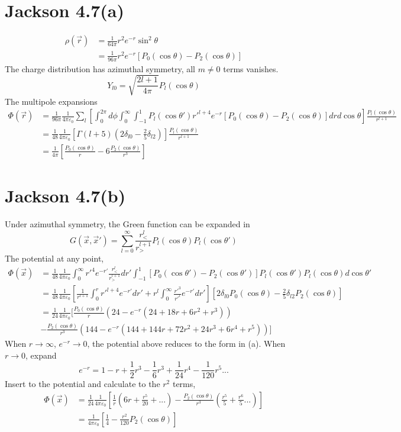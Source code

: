 \documentclass{article}
\begin{document}
\section*{Jackson 4.7(a)}

\begin{align*}
  \rho(\vec r)&=\frac{1}{64\pi}r^2e^{-r}\sin^2\theta\\
              &=\frac{1}{96\pi}r^2e^{-r}[P_0(\cos\theta)-P_2(\cos\theta)]
\end{align*}
The charge distribution has azimuthal symmetry, all $m\neq0$ terms vanishes.
\[ Y_{l0}=\sqrt{\frac{2l+1}{4\pi}}P_l(\cos\theta) \]
The multipole expansions
\begin{align*}
  \Phi(\vec r)&=\frac{1}{96\pi}\frac{1}{4\pi\varepsilon_0}\sum_{l}[\int_0^{2\pi}d\phi \int_0^\infty\int_{-1}^{1}P_l(\cos\theta')r'^{l+4}e^{-r}[P_0(\cos\theta)-P_2(\cos\theta)]drd\cos\theta]\frac{P_l(\cos\theta)}{r^{l+1}}\\
              &=\frac{1}{48}\frac{1}{4\pi\varepsilon_0}[\Gamma(l+5)(2\delta_{l0}-\frac 25 \delta_{l2})]\frac{P_l(\cos\theta)}{r^{l+1}}\\
              &=\frac{1}{4\pi}[\frac{P_0(\cos\theta)}{r}-6\frac{P_2(\cos\theta)}{r^3}]
\end{align*}

\section*{Jackson 4.7(b)}
Under azimuthal symmetry, the Green function can be expanded in
\[ G(\vec x, \vec x')=\sum_{l=0}^\infty\frac{r_<^l}{r_>^{l+1}}P_l(\cos\theta)P_l(\cos\theta') \]
The potential at any point,
\begin{align*}
  \Phi(\vec x)&=\frac{1}{48}\frac{1}{4\pi\varepsilon_0}\int_0^\infty r'^4e^{-r'}\frac{r_<^l}{r_>^{l+1}}dr'\int_{-1}^{1}[P_0(\cos\theta')-P_2(\cos\theta')]P_l(\cos\theta')P_l(\cos\theta)d\cos\theta'\\
              &=\frac{1}{48}\frac{1}{4\pi\varepsilon_0}[\frac{1}{r^{l+1}}\int_0^r r'^{l+4}e^{-r'}dr'+r^l\int_0^\infty \frac{r'^3}{r'^l}e^{-r'}dr'][2\delta_{l0}P_0(\cos\theta)-\frac{2}{5}\delta_{l2}P_2(\cos\theta)]\\
              &=\frac{1}{24}\frac{1}{4\pi\varepsilon_0}[\frac{P_0(\cos\theta)}{r}(24-e^{-r}(24+18r+6r^2+r^3))\\
              &-\frac{P_2(\cos\theta)}{r^3}(144-e^{-r}(144+144r+72r^2+24r^3+6r^4+r^5))]
\end{align*}
When $r\rightarrow\infty$, $e^{-r}\rightarrow 0$, the potential above reduces to the form in (a). When $r\rightarrow 0$, expand
\[e^{-r}=1-r+\frac{1}{2}r^3-\frac{1}{6}r^3+\frac{1}{24}r^4-\frac{1}{120}r^5...\]
Insert to the potential and calculate to the $r^2$ terms,
\begin{align*}
  \Phi(\vec x)&=\frac{1}{24}\frac{1}{4\pi\varepsilon_0}[\frac{1}{r}(6r+\frac{r^5}{20}+...)-\frac{P_2(\cos\theta)}{r^3}(\frac{r^5}{5}+\frac{r^6}{5}...)]\\
              &=\frac{1}{4\pi\varepsilon_0}[\frac{1}{4}-\frac{r^2}{120}P_2(\cos\theta)]
\end{align*}
% 
% 
\end{document}

